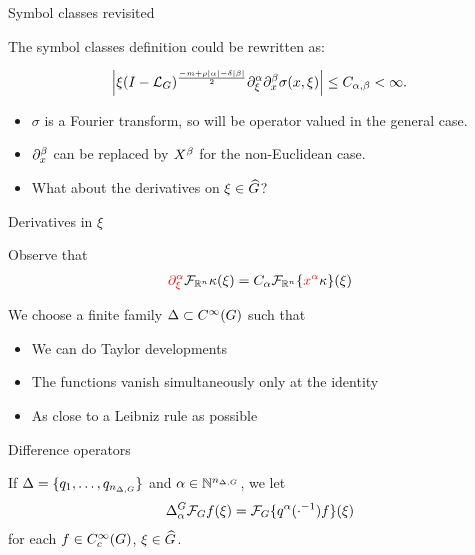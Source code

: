 \documentclass[handout]{beamer}
\begin{document}
\begin{frame}
    {Symbol classes revisited}

    The symbol classes definition could be rewritten as:

    \begin{align*}
        \abs {%
            \xi
            \BesselPotential {-m + \rho \abs \alpha - \delta \abs \beta}
            \iD {\xi^\alpha}
            \iD {x^\beta}
            \sigma(x, \xi)
        } \leq
        C_{\alpha, \beta}
        < \infty.
    \end{align*}

    \pause
    \begin{itemize}
        \item $\sigma$ is a Fourier transform,
            so will be operator valued in the general case.
            \pause
        \item $\iD {x^\beta}$ can be replaced by $\LeftDifferentialOperator \beta$ for the non-Euclidean case.
            \pause
        \item What about the derivatives on $\xi \in {\widehat{G}}$?
    \end{itemize}
\end{frame}

\begin{frame}
    {Derivatives in $\xi$}

    Observe that
    \begin{align*}
        {\color{red} \iD {\xi^\alpha}} \Fourier [\R^n] \kappa(\xi)
        = C_\alpha \Fourier [\R^n] {\{{\color{red} x^\alpha} \kappa\}}(\xi)
    \end{align*}

    \pause
    We choose a finite family $\Delta \subset {C^\infty(G)}$ such that
    \begin{itemize}
        \pause
        \item
            We can do Taylor developments
            \pause
        \item The functions vanish simultaneously only at the identity
            \pause
        \item
            As close to a Leibniz rule as possible
    \end{itemize}
\end{frame}

\begin{frame}
    {Difference operators}

    \begin{definition}

        If $\Delta = \{q_1, \dots, q_{n_{\Delta, G}} \}$ and $\alpha \in \mathbb{N}^{n_{\Delta, G}}$,
        we let
        \begin{align*}
            {\Delta^{G}_{\alpha}} \mathcal{F}_{G} f(\xi)
            = \mathcal{F}_{G} \{q^\alpha(\cdot^{-1}) f\}(\xi)
        \end{align*}
        for each $f \in C^\infty_c(G)$,
        $\xi \in {\widehat{G}}$.
    \end{definition}
\end{frame}
\end{document}
